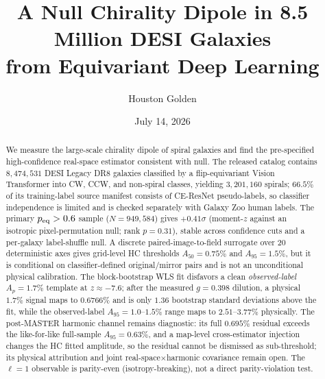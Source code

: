 \documentclass[aps,prd,twocolumn,superscriptaddress,preprintnumbers,nofootinbib,longbibliography,floatfix]{revtex4-2}
\newcommand{\sigmaunit}{\sigma}
\newcommand{\paperTimestamp}{July 14, 2026}
\begin{document}
\title{A Null Chirality Dipole in 8.5 Million DESI Galaxies\\
from Equivariant Deep Learning}

\author{Houston Golden}

\date{\paperTimestamp}

\begin{abstract}
We measure the large-scale chirality dipole of spiral galaxies and find the pre-specified high-confidence real-space estimator consistent with null. The released catalog contains $8{,}474{,}531$ DESI Legacy DR8 galaxies classified by a flip-equivariant Vision Transformer into CW, CCW, and non-spiral classes, yielding $3{,}201{,}160$ spirals; $66.5\%$ of its training-label source manifest consists of CE-ResNet pseudo-labels, so classifier independence is limited and is checked separately with Galaxy Zoo human labels. The primary $p_{\rm eq}>0.6$ sample ($N=949{,}584$) gives $+0.41\sigmaunit$ (moment-$z$ against an isotropic pixel-permutation null; rank $p=0.31$), stable across confidence cuts and a per-galaxy label-shuffle null. A discrete paired-image-to-field surrogate over 20 deterministic axes gives grid-level HC thresholds $A_{50}=0.75\%$ and $A_{95}=1.5\%$, but it is conditional on classifier-defined original/mirror pairs and is not an unconditional physical calibration. The block-bootstrap WLS fit disfavors a clean \emph{observed-label} $A_p=1.7\%$ template at $z\approx-7.6$; after the measured $g=0.398$ dilution, a physical $1.7\%$ signal maps to $0.6766\%$ and is only $1.36$ bootstrap standard deviations above the fit, while the observed-label $A_{95}=1.0$--$1.5\%$ range maps to $2.51$--$3.77\%$ physically. The post-MASTER harmonic channel remains diagnostic: its full $0.695\%$ residual exceeds the like-for-like full-sample $A_{95}=0.63\%$, and a map-level cross-estimator injection changes the HC fitted amplitude, so the residual cannot be dismissed as sub-threshold; its physical attribution and joint real-space$\times$harmonic covariance remain open. The $\ell=1$ observable is parity-even (isotropy-breaking), not a direct parity-violation test.
\end{abstract}


\maketitle
\tableofcontents
\end{document}
